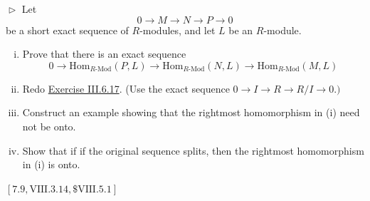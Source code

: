 \documentclass[12pt,letterpaper,boxed]{hmcpset}
\begin{document}
\begin{problem}[7.7]
$\vartriangleright$ Let
\[
0 \longrightarrow M \longrightarrow N \longrightarrow P \longrightarrow0
\]
be a short exact sequence of $R$-modules, and let $L$ be an $R$-module.
\begin{enumerate}[(i)]
\item Prove that there is an exact sequence
	\[
	0 \longrightarrow \mathrm{Hom}_{R\text{-}\mathrm{Mod}}(P, L) \longrightarrow \mathrm{Hom}_{R\text{-}\mathrm{Mod}}(N, L) \longrightarrow \mathrm{Hom}_{R\text{-}\mathrm{Mod}}(M, L)
	\]
\item Redo \hyperlink{Exercise III.6.17}{Exercise III.6.17}. (Use the exact sequence $0 \rightarrow I \rightarrow R \rightarrow R / I \rightarrow 0 .)$
\item Construct an example showing that the rightmost homomorphism in (i) need not be onto.
\item Show that if if the original sequence splits, then the rightmost homomorphism in (i) is onto.
\end{enumerate}
$[7.9, \mathrm{VIII} .3 .14, \$ \mathrm{VIII.} 5.1]$

\end{problem}
\end{document}
